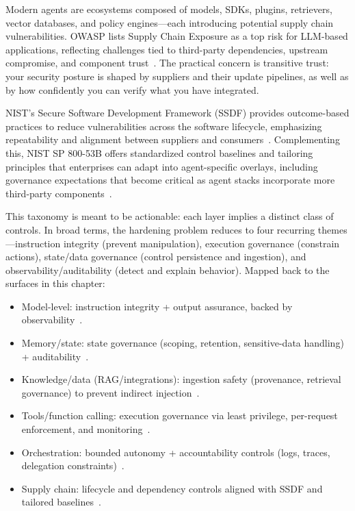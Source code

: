 \begin{TNtwocol}
  Modern agents are ecosystems composed of models, SDKs, plugins, retrievers, vector databases, and policy engines—each introducing potential supply chain vulnerabilities. OWASP lists Supply Chain Exposure as a top risk for LLM-based applications, reflecting challenges tied to third-party dependencies, upstream compromise, and component trust~\cite{owasp-top10-llm-2025,nist-sp800-218}. The practical concern is transitive trust: your security posture is shaped by suppliers and their update pipelines, as well as by how confidently you can verify what you have integrated.

  \medskip

  NIST's Secure Software Development Framework (SSDF) provides outcome-based practices to reduce vulnerabilities across the software lifecycle, emphasizing repeatability and alignment between suppliers and consumers~\cite{nist-sp800-218}. Complementing this, NIST SP 800-53B offers standardized control baselines and tailoring principles that enterprises can adapt into agent-specific overlays, including governance expectations that become critical as agent stacks incorporate more third-party components~\cite{nist-sp800-53b,nist-airmf-100-1}.

  \medskip

  This taxonomy is meant to be actionable: each layer implies a distinct class of controls. In broad terms, the hardening problem reduces to four recurring themes—instruction integrity (prevent manipulation), execution governance (constrain actions), state/data governance (control persistence and ingestion), and observability/auditability (detect and explain behavior). Mapped back to the surfaces in this chapter:

  \begin{itemize}
    \item Model-level: instruction integrity + output assurance, backed by observability~\cite{owasp-top10-llm-2025,nist-genai-600-1}.
    \item Memory/state: state governance (scoping, retention, sensitive-data handling) + auditability~\cite{owasp-top10-llm-2025}.
    \item Knowledge/data (RAG/integrations): ingestion safety (provenance, retrieval governance) to prevent indirect injection~\cite{owasp-prompt-injection-cheatsheet,owasp-top10-llm-2025}.
    \item Tools/function calling: execution governance via least privilege, per-request enforcement, and monitoring~\cite{nist-sp800-207,cisa-ztmm-v2}.
    \item Orchestration: bounded autonomy + accountability controls (logs, traces, delegation constraints)~\cite{owasp-top10-llm-2025,nist-sp800-53b}.
    \item Supply chain: lifecycle and dependency controls aligned with SSDF and tailored baselines~\cite{nist-sp800-218,nist-sp800-53b}.
  \end{itemize}


\end{TNtwocol}
